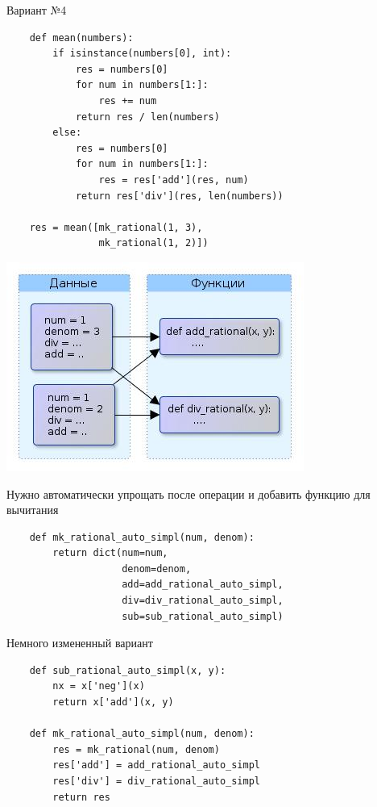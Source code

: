 \documentclass{article}
\begin{document}
\begin{center} Вариант №4 \end{center}
\begin{lstlisting}
    def mean(numbers):
        if isinstance(numbers[0], int):
            res = numbers[0]
            for num in numbers[1:]:
                res += num
            return res / len(numbers)
        else:
            res = numbers[0]
            for num in numbers[1:]:
                res = res['add'](res, num)
            return res['div'](res, len(numbers))

    res = mean([mk_rational(1, 3), 
                mk_rational(1, 2)])
\end{lstlisting}
\newpage

\begin{center} \includegraphics{images/semi_OOP_style.jpg} \end{center} 
\newpage

\begin{center} Нужно автоматически упрощать после операции 
    и добавить функцию для вычитания \end{center}
\begin{lstlisting}
    def mk_rational_auto_simpl(num, denom):
        return dict(num=num, 
                    denom=denom, 
                    add=add_rational_auto_simpl, 
                    div=div_rational_auto_simpl,
                    sub=sub_rational_auto_simpl)
\end{lstlisting}
\newpage

\begin{center} Немного измененный вариант \end{center}
\begin{lstlisting}
    def sub_rational_auto_simpl(x, y):
        nx = x['neg'](x)
        return x['add'](x, y)

    def mk_rational_auto_simpl(num, denom):
        res = mk_rational(num, denom)
        res['add'] = add_rational_auto_simpl
        res['div'] = div_rational_auto_simpl
        return res
\end{lstlisting}
\newpage
\end{document}
